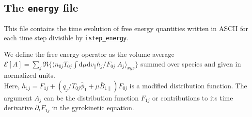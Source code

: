 \documentclass[12pt]{article}
\begin{document}
\subsection{The \texttt{energy} file}
\label{subsec:energy-file}
This file contains the time evolution of free energy
quantities written in ASCII for each time step divisible by
\hyperlink{istep_energy}{\tt istep\_energy}.

We define the free energy operator as the volume average\\
$\mathcal{E}[A] = \sum_j \Re\{\langle n_{0j} T_{0j}\int \mathrm{d}\mu\mathrm{d}v_{\|} h_j/F_{0j}\;
A_j\rangle_{xyz}\}$ summed over species and given in normalized units.
\\ Here, $h_{1j}=F_{1j}+(q_j/T_{0j}\bar{\phi}_1 +\mu
\bar{B}_{1\|})F_{0j}$ is a modified distribution function.
The argument $A_j$ can be the distribution function $F_{1j}$ or
contributions to its time
derivative $\partial_t F_{1j}$ in the gyrokinetic equation.
\end{document}
